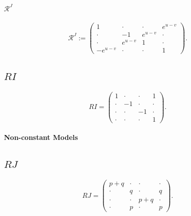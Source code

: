 \documentclass{article}
\begin{document}
\paragraph{$\mathcal{R}^J$}
\begin{equation}
\label{RJ}
  \mathcal{R}^J:= \begin{pmatrix}
        1&\cdot&\cdot&e^{u-v}\\
        \cdot&-1&e^{u-v}&\cdot\\
        \cdot&e^{u-v}&1&\cdot\\
        -e^{u-v}&\cdot&\cdot&1
    \end{pmatrix}.
\end{equation}

\subsection{$RI$}
\begin{equation}
   RI= \begin{pmatrix}
        1&\cdot&\cdot&1\\
        \cdot&-1&\cdot&\cdot\\
        \cdot&\cdot&-1&\cdot\\
        \cdot&\cdot&\cdot&1
    \end{pmatrix}.
\end{equation}

\paragraph{\textcolor{OliveGreen}{Non-constant Models}}
\begin{center}
\end{center}


\subsection{$RJ$}
\label{sec:RJ}
\begin{equation}
   RJ=\begin{pmatrix}
        p+q&\cdot&\cdot&\cdot\\
        \cdot&q&\cdot&q\\
        \cdot&\cdot &p+q&\cdot\\
        \cdot&p &\cdot&p
    \end{pmatrix}.
    \end{equation}
    
\end{document}
